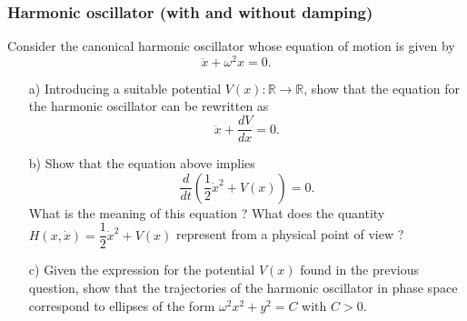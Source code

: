 \subsubsection*{Harmonic oscillator (with and without damping)}

\begin{problem}
  Consider the canonical harmonic oscillator whose equation of motion is given by
  \[
  \ddot{x} + \omega^2 x = 0.
  \]

  \begin{enumerate}
  \item[a)] Introducing a suitable potential $V(x) : \mathbb{R} \to \mathbb{R}$, show that the equation for the harmonic oscillator can be rewritten as
    \[
    \ddot{x} + \dfrac{dV}{dx} = 0.
    \]

  \item[b)] Show that the equation above implies
    \[
    \dfrac{d}{dt} \left( \dfrac{1}{2} \dot{x}^2 + V(x) \right) = 0.
    \]
    What is the meaning of this equation ?
    What does the quantity $H(x, \dot{x}) = \dfrac{1}{2} \dot{x}^2 + V(x)$ represent from a physical point of view ?

  \item[c)] Given the expression for the potential $V(x)$ found in the previous question, show that the trajectories of the harmonic oscillator in phase space correspond to ellipses of the form $\omega^2 x^2 + y^2 = C$ with $C > 0$.
  \end{enumerate}
\end{problem}

\bigskip

